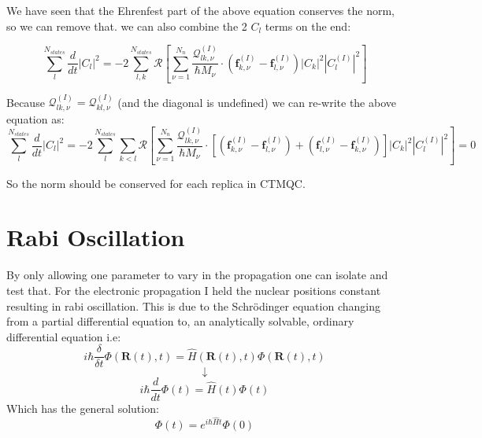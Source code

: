 We have seen that the Ehrenfest part of the above equation conserves the norm, so we can remove that. we can also combine the 2 $C_l$ terms on the end:

\[ \sum_{l}^{N_{states}} \frac{d}{dt} \vert C_{l} \vert^2 = -2 \sum_{l,k}^{N_{states}} \mathcal{R}\left[ \sum_{\nu=1}^{N_n}\frac{\mathcal{Q}_{lk,\nu}^{(I)}}{\hbar M_{\nu}}\cdot \left(\textbf{f}_{k,\nu}^{(I)} - \textbf{f}_{l,\nu}^{(I)}\right)|C_k|^2 |C_l^{(I)}|^2 \right] \]

Because $\mathcal{Q}_{lk,\nu}^{(I)} = \mathcal{Q}_{kl,\nu}^{(I)}$ (and the diagonal is undefined) we can re-write the above equation as:
\[ \sum_{l}^{N_{states}} \frac{d}{dt} \vert C_{l} \vert^2 = -2 \sum_{l}^{N_{states}} \sum_{k<l} \mathcal{R}\left[ \sum_{\nu=1}^{N_n}\frac{\mathcal{Q}_{lk,\nu}^{(I)}}{\hbar M_{\nu}}\cdot \left[ \left(\textbf{f}_{k,\nu}^{(I)} - \textbf{f}_{l,\nu}^{(I)}\right) + \left(\textbf{f}_{l,\nu}^{(I)} - \textbf{f}_{k,\nu}^{(I)}\right)\right]|C_k|^2 |C_l^{(I)}|^2 \right] = 0 \]

So the norm should be conserved for each replica in CTMQC.

\section{Rabi Oscillation \label{ap:Rabi}}
By only allowing one parameter to vary in the propagation one can isolate and test that. For the electronic propagation I held the nuclear positions constant resulting in rabi oscillation. This is due  to the Schr\"odinger equation changing from a partial differential equation to, an analytically solvable, ordinary differential equation  i.e:
\[i \hbar \frac{\delta}{\delta t} \Phi(\textbf{R}(t), t) = \hat{H}(\textbf{R}(t), t) \Phi(\textbf{R}(t), t)\]
\[\downarrow\]
\[i \hbar \frac{d}{d t} \Phi(t) = \hat{H}(t) \Phi( t)\]
Which has the general solution:
\[\Phi(t) = e^{i \hbar \hat{H}t} \Phi(0)\]




